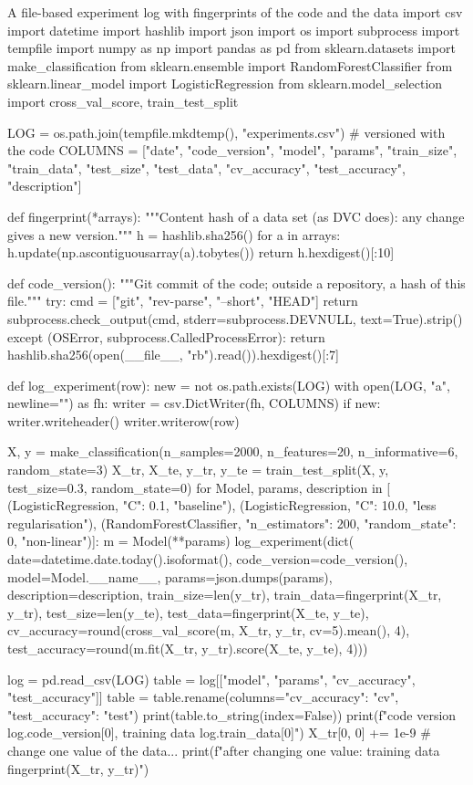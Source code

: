 \begin{pylisting}[label={lst:tracking}]{A file-based experiment log with fingerprints of the code and the data}
import csv
import datetime
import hashlib
import json
import os
import subprocess
import tempfile
import numpy as np
import pandas as pd
from sklearn.datasets import make_classification
from sklearn.ensemble import RandomForestClassifier
from sklearn.linear_model import LogisticRegression
from sklearn.model_selection import cross_val_score, train_test_split

LOG = os.path.join(tempfile.mkdtemp(), "experiments.csv")   # versioned with the code
COLUMNS = ["date", "code_version", "model", "params", "train_size", "train_data",
           "test_size", "test_data", "cv_accuracy", "test_accuracy", "description"]

def fingerprint(*arrays):
    """Content hash of a data set (as DVC does): any change gives a new version."""
    h = hashlib.sha256()
    for a in arrays:
        h.update(np.ascontiguousarray(a).tobytes())
    return h.hexdigest()[:10]

def code_version():
    """Git commit of the code; outside a repository, a hash of this file."""
    try:
        cmd = ["git", "rev-parse", "--short", "HEAD"]
        return subprocess.check_output(cmd, stderr=subprocess.DEVNULL, text=True).strip()
    except (OSError, subprocess.CalledProcessError):
        return hashlib.sha256(open(__file__, "rb").read()).hexdigest()[:7]

def log_experiment(row):
    new = not os.path.exists(LOG)
    with open(LOG, "a", newline="") as fh:
        writer = csv.DictWriter(fh, COLUMNS)
        if new:
            writer.writeheader()
        writer.writerow(row)

X, y = make_classification(n_samples=2000, n_features=20, n_informative=6, random_state=3)
X_tr, X_te, y_tr, y_te = train_test_split(X, y, test_size=0.3, random_state=0)
for Model, params, description in [
        (LogisticRegression, {"C": 0.1}, "baseline"),
        (LogisticRegression, {"C": 10.0}, "less regularisation"),
        (RandomForestClassifier, {"n_estimators": 200, "random_state": 0}, "non-linear")]:
    m = Model(**params)
    log_experiment(dict(
        date=datetime.date.today().isoformat(), code_version=code_version(),
        model=Model.__name__, params=json.dumps(params), description=description,
        train_size=len(y_tr), train_data=fingerprint(X_tr, y_tr),
        test_size=len(y_te), test_data=fingerprint(X_te, y_te),
        cv_accuracy=round(cross_val_score(m, X_tr, y_tr, cv=5).mean(), 4),
        test_accuracy=round(m.fit(X_tr, y_tr).score(X_te, y_te), 4)))

log = pd.read_csv(LOG)
table = log[["model", "params", "cv_accuracy", "test_accuracy"]]
table = table.rename(columns={"cv_accuracy": "cv", "test_accuracy": "test"})
print(table.to_string(index=False))
print(f"code version {log.code_version[0]}, training data {log.train_data[0]}")
X_tr[0, 0] += 1e-9                                   # change one value of the data...
print(f"after changing one value: training data {fingerprint(X_tr, y_tr)}")
\end{pylisting}
